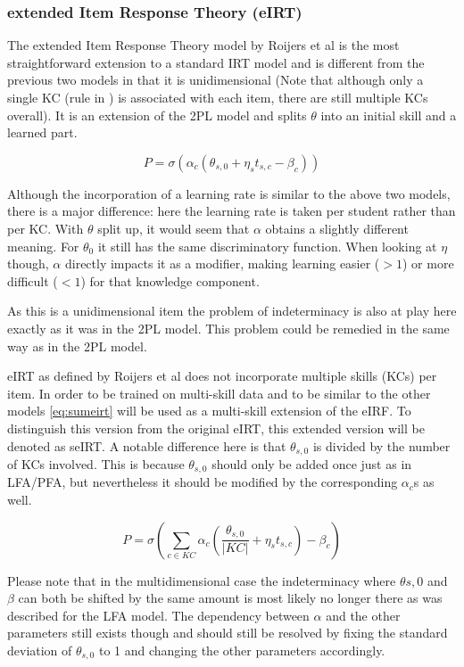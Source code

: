\documentclass{scrartcl}
\begin{document}
\subsubsection{extended Item Response Theory (eIRT)}
\label{sec:eirt}
The extended Item Response Theory model by Roijers et al \cite{eirt} is the most straightforward extension to a standard IRT model and is different from the previous two models in that it is unidimensional (Note that although only a single KC (rule in \cite{eirt}) is associated with each item, there are still multiple KCs overall).  It is an extension of the 2PL model and splits $\theta$ into an initial skill and a learned part. 

\begin{equation}
\label{eq:eirt}
P = \sigma(\alpha_{c} (\theta_{s,0} + \eta_{s} t_{s,c} - \beta_{c}))
\end{equation}

Although the incorporation of a learning rate is similar to the above two models, there is a major difference: here the learning rate is taken per student rather than per KC. With $\theta$ split up, it would seem that $\alpha$ obtains a slightly different meaning. For $\theta_{0}$ it still has the same discriminatory function. When looking at $\eta$ though, $\alpha$ directly impacts it as a modifier, making learning easier ($>1$) or more difficult ($<1$) for that knowledge component.

As this is a unidimensional item the problem of indeterminacy is also at play here exactly as it was in the 2PL model. This problem could be remedied in the same way as in the 2PL model.

eIRT as defined by Roijers et al does not incorporate multiple skills (KCs) per item. In order to be trained on multi-skill data and to be similar to the other models \ref{eq:sumeirt} will be used as a multi-skill extension of the eIRF. To distinguish this version from the original eIRT, this extended version will be denoted as seIRT. A notable difference here is that $\theta_{s,0}$ is divided by the number of KCs involved. This is because $\theta_{s,0}$ should only be added once just as in LFA/PFA, but nevertheless it should be modified by the corresponding $\alpha_{c}$s as well.

\begin{equation}
\label{eq:sumeirt}
P = \sigma(\sum_{c \in KC} \alpha_{c}(\frac{\theta_{s,0}}{|KC|} + \eta_{s} t_{s,c}) - \beta_{c})
\end{equation}

Please note that in the multidimensional case the indeterminacy where $\theta{s,0}$ and $\beta$ can both be shifted by the same amount is most likely no longer there as was described for the LFA model. The dependency between $\alpha$ and the other parameters still exists though and should still be resolved by fixing the standard deviation of $\theta_{s,0}$ to 1 and changing the other parameters accordingly.
\end{document}
